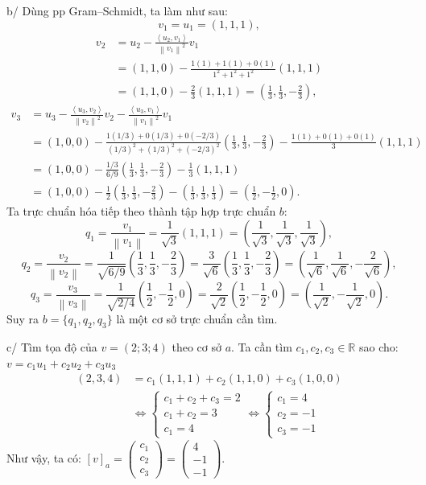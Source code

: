 \documentclass[12pt,a4paper]{article}
\newcommand{\R}{\mathbb{R}}
\newcommand{\ip}[2]{\left\langle #1,#2\right\rangle}
\newcommand{\norm}[1]{\left\|#1\right\|}
\begin{document}
b/ Dùng pp Gram--Schmidt, ta làm như sau:
\[
v_1 = u_1 = (1, 1, 1),
\]
\begin{align*}
v_2 &= u_2 - \frac{\ip{u_2}{v_1}}{\norm{v_1}^2}v_1 \\
    &= (1, 1, 0) - \frac{1(1) + 1(1) + 0(1)}{1^2 + 1^2 + 1^2}(1, 1, 1) \\
    &= (1, 1, 0) - \frac{2}{3}(1, 1, 1) = \left(\frac{1}{3}, \frac{1}{3}, -\frac{2}{3}\right),
\end{align*}
\begin{align*}
v_3 &= u_3 - \frac{\ip{u_3}{v_2}}{\norm{v_2}^2}v_2 - \frac{\ip{u_3}{v_1}}{\norm{v_1}^2}v_1 \\
    &= (1, 0, 0) - \frac{1(1/3) + 0(1/3) + 0(-2/3)}{(1/3)^2 + (1/3)^2 + (-2/3)^2}\left(\frac{1}{3}, \frac{1}{3}, -\frac{2}{3}\right) - \frac{1(1) + 0(1) + 0(1)}{3}(1, 1, 1) \\
    &= (1, 0, 0) - \frac{1/3}{6/9}\left(\frac{1}{3}, \frac{1}{3}, -\frac{2}{3}\right) - \frac{1}{3}(1, 1, 1) \\
    &= (1, 0, 0) - \frac{1}{2}\left(\frac{1}{3}, \frac{1}{3}, -\frac{2}{3}\right) - \left(\frac{1}{3}, \frac{1}{3}, \frac{1}{3}\right) = \left(\frac{1}{2}, -\frac{1}{2}, 0\right).
\end{align*}
Ta trực chuẩn hóa tiếp theo thành tập hợp trực chuẩn $b$:
\[
q_1 = \frac{v_1}{\norm{v_1}} = \frac{1}{\sqrt{3}}(1, 1, 1) = \left(\frac{1}{\sqrt{3}}, \frac{1}{\sqrt{3}}, \frac{1}{\sqrt{3}}\right),
\]
\[
q_2 = \frac{v_2}{\norm{v_2}} = \frac{1}{\sqrt{6/9}}\left(\frac{1}{3}, \frac{1}{3}, -\frac{2}{3}\right) = \frac{3}{\sqrt{6}}\left(\frac{1}{3}, \frac{1}{3}, -\frac{2}{3}\right) = \left(\frac{1}{\sqrt{6}}, \frac{1}{\sqrt{6}}, -\frac{2}{\sqrt{6}}\right),
\]
\[
q_3 = \frac{v_3}{\norm{v_3}} = \frac{1}{\sqrt{2/4}}\left(\frac{1}{2}, -\frac{1}{2}, 0\right) = \frac{2}{\sqrt{2}}\left(\frac{1}{2}, -\frac{1}{2}, 0\right) = \left(\frac{1}{\sqrt{2}}, -\frac{1}{\sqrt{2}}, 0\right).
\]
Suy ra $b = \{q_1, q_2, q_3\}$ là một cơ sở trực chuẩn cần tìm.

c/ Tìm tọa độ của $v=(2; 3; 4)$ theo cơ sở $a$.
Ta cần tìm $c_1, c_2, c_3 \in \R$ sao cho: $v = c_1u_1 + c_2u_2 + c_3u_3$
\begin{align*}
(2, 3, 4) &= c_1(1, 1, 1) + c_2(1, 1, 0) + c_3(1, 0, 0) \\
&\Leftrightarrow \begin{cases} 
c_1 + c_2 + c_3 = 2 \\ 
c_1 + c_2 = 3 \\ 
c_1 = 4 
\end{cases} \Leftrightarrow \begin{cases} 
c_1 = 4 \\ 
c_2 = -1 \\ 
c_3 = -1 
\end{cases}
\end{align*}
Như vậy, ta có: $[v]_a = \begin{pmatrix} c_1 \\ c_2 \\ c_3 \end{pmatrix} = \begin{pmatrix} 4 \\ -1 \\ -1 \end{pmatrix}$.
\end{document}
